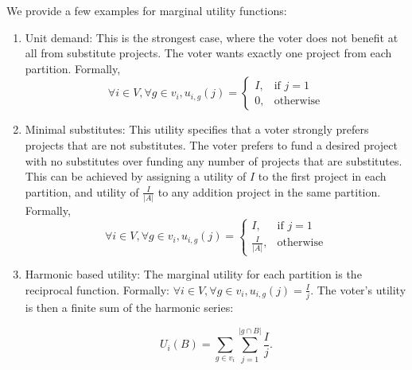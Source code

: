 \documentclass[runningheads]{llncs}
\begin{document}
We provide a few examples for  marginal utility functions:
\begin{enumerate}
    \item Unit demand: This is the strongest case, where   the voter does not benefit at all from substitute projects. The voter wants exactly one project from each partition. Formally, $$\forall i\in V, \forall g\in v_i, u_{i,g}(j)= 
        \begin{cases}
            I             ,& \text{if } j=1\\
            0,             & \text{otherwise}
        \end{cases}$$

    \item Minimal substitutes: This utility specifies that   a voter strongly prefers projects that are not substitutes.  The voter prefers to fund  a desired project with no substitutes   over funding any number of projects that are substitutes.
     This can be achieved by assigning  a utility of $I$ to the first project in each partition, and utility of $\frac{I}{|A|}$ to any addition project in the same partition. 
    Formally, $$\forall i\in V, \forall g\in v_i, u_{i,g}(j)= 
        \begin{cases}
            I                         ,& \text{if } j=1\\
            \frac{I}{|A|},             & \text{otherwise}
        \end{cases}$$
    
    \item Harmonic based utility:  The marginal utility for each partition is the reciprocal function. Formally: $\forall i\in V, \forall g\in v_i, u_{i,g}(j)=\frac{I}{j}$. The voter's utility is then a finite sum of the harmonic series: 
    
    $$U_i(B)=\sum_{g\in{v_i}}\sum_{j=1}^{|g\cap B|}\frac{I}{j}.$$
\end{enumerate}


\end{document}
